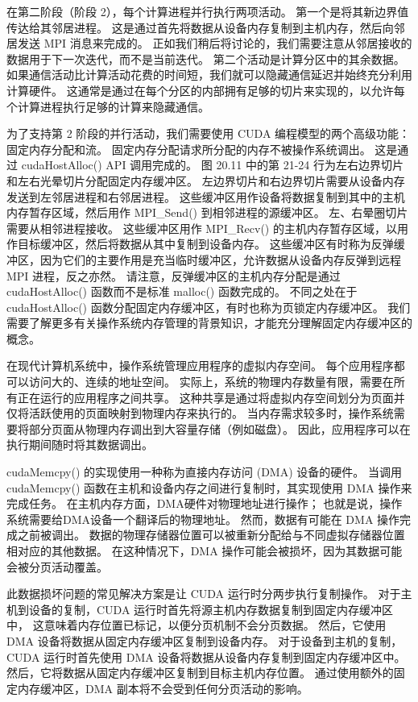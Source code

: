 在第二阶段（阶段 2），每个计算进程并行执行两项活动。 第一个是将其新边界值传达给其邻居进程。 
这是通过首先将数据从设备内存复制到主机内存，然后向邻居发送 MPI 消息来完成的。 
正如我们稍后将讨论的，我们需要注意从邻居接收的数据用于下一次迭代，而不是当前迭代。 第二个活动是计算分区中的其余数据。 
如果通信活动比计算活动花费的时间短，我们就可以隐藏通信延迟并始终充分利用计算硬件。 
这通常是通过在每个分区的内部拥有足够的切片来实现的，以允许每个计算进程执行足够的计算来隐藏通信。

为了支持第 2 阶段的并行活动，我们需要使用 CUDA 编程模型的两个高级功能：固定内存分配和流。 
固定内存分配请求所分配的内存不被操作系统调出。 这是通过 cudaHostAlloc() API 调用完成的。 
图 20.11 中的第 21-24 行为左右边界切片和左右光晕切片分配固定内存缓冲区。 
左边界切片和右边界切片需要从设备内存发送到左邻居进程和右邻居进程。 
这些缓冲区用作设备将数据复制到其中的主机内存暂存区域，然后用作 MPI\_Send() 到相邻进程的源缓冲区。 
左、右晕圈切片需要从相邻进程接收。 
这些缓冲区用作 MPI\_Recv() 的主机内存暂存区域，以用作目标缓冲区，然后将数据从其中复制到设备内存。 
这些缓冲区有时称为反弹缓冲区，因为它们的主要作用是充当临时缓冲区，允许数据从设备内存反弹到远程 MPI 进程，反之亦然。 
请注意，反弹缓冲区的主机内存分配是通过 cudaHostAlloc() 函数而不是标准 malloc() 函数完成的。 
不同之处在于 cudaHostAlloc() 函数分配固定内存缓冲区，有时也称为页锁定内存缓冲区。 
我们需要了解更多有关操作系统内存管理的背景知识，才能充分理解固定内存缓冲区的概念。

在现代计算机系统中，操作系统管理应用程序的虚拟内存空间。 每个应用程序都可以访问大的、连续的地址空间。 
实际上，系统的物理内存数量有限，需要在所有正在运行的应用程序之间共享。 
这种共享是通过将虚拟内存空间划分为页面并仅将活跃使用的页面映射到物理内存来执行的。 
当内存需求较多时，操作系统需要将部分页面从物理内存调出到大容量存储（例如磁盘）。 
因此，应用程序可以在执行期间随时将其数据调出。

cudaMemcpy() 的实现使用一种称为直接内存访问 (DMA) 设备的硬件。 
当调用 cudaMemcpy() 函数在主机和设备内存之间进行复制时，其实现使用 DMA 操作来完成任务。 
在主机内存方面，DMA硬件对物理地址进行操作； 也就是说，操作系统需要给DMA设备一个翻译后的物理地址。 
然而，数据有可能在 DMA 操作完成之前被调出。 数据的物理存储器位置可以被重新分配给与不同虚拟存储器位置相对应的其他数据。 
在这种情况下，DMA 操作可能会被损坏，因为其数据可能会被分页活动覆盖。

此数据损坏问题的常见解决方案是让 CUDA 运行时分两步执行复制操作。 
对于主机到设备的复制，CUDA 运行时首先将源主机内存数据复制到固定内存缓冲区中，
这意味着内存位置已标记，以便分页机制不会分页数据。 然后，它使用 DMA 设备将数据从固定内存缓冲区复制到设备内存。 
对于设备到主机的复制，CUDA 运行时首先使用 DMA 设备将数据从设备内存复制到固定内存缓冲区中。 
然后，它将数据从固定内存缓冲区复制到目标主机内存位置。 
通过使用额外的固定内存缓冲区，DMA 副本将不会受到任何分页活动的影响。

